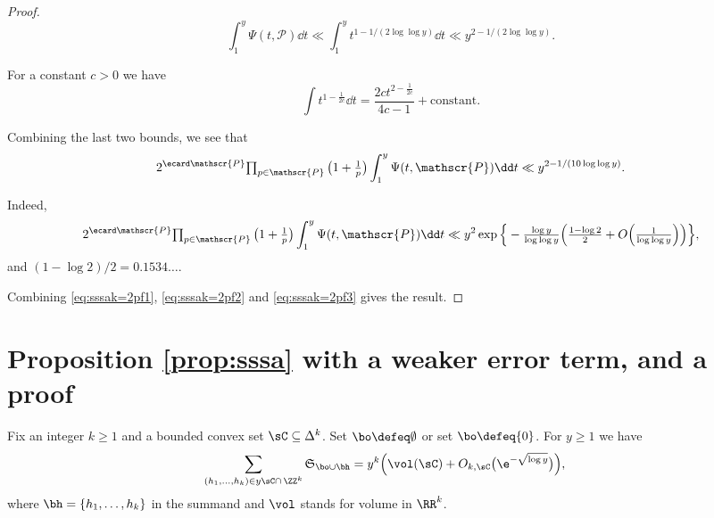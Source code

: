 \documentclass[12pt, reqno, twoside, letterpaper]{amsart}
\begin{document}
\begin{jetsam}
\begin{proof}
\[
 \int_{1}^y \Psi(t,\mathscr{P}) \dd t
  \ll
   \int_1^{y} t^{1 - 1/(2\log\log y)} \dd t
    \ll
     y^{2 - 1/(2\log\log y)}.
\]
%
\begin{nixnix}
For a constant $c > 0$ we have
\[
 \int t^{1 - \frac{1}{2c}} \dd t
  =
   \frac{2ct^{2 - \frac{1}{2c}}}{4c - 1} + \text{constant}.
\]
\end{nixnix}
%
Combining the last two bounds, we see that  
\begin{equation}
 \label{eq:sssak=2pf3}
 2^{\ecard \mathscr{P}}
    {\textstyle \prod_{p \in \mathscr{P}}  \big(1 + \frac{1}{p}\big) }
      \int_1^y \Psi(t,\mathscr{P}) \dd t
       \ll
        y^{2 - 1/(10\log\log y)}.
\end{equation}
%
\begin{nixnix}
Indeed, 
\[
 2^{\ecard \mathscr{P}}
    {\textstyle \prod_{p \in \mathscr{P}}  \big(1 + \frac{1}{p}\big) }
     \int_1^y \Psi(t,\mathscr{P}) \dd t
  \ll
   y^2
   \textstyle 
    \exp\Big\{-\frac{\log y}{\log\log y}\Big(\frac{1 - \log 2}{2} + O\Big(\frac{1}{\log\log y}\Big)\Big)\Big\},
\]
and $(1 - \log 2)/2 = 0.1534\ldots$.
\end{nixnix}

Combining \eqref{eq:sssak=2pf1}, \eqref{eq:sssak=2pf2} and 
\eqref{eq:sssak=2pf3} gives the result.
\end{proof}


\section{Proposition \ref{prop:sssa} with a weaker error term, and a proof}
 \label{Jsec:keyprop}

\begin{proposition}
 \label{Jprop:sssa}
%
Fix an integer $k \ge 1$ and a bounded convex set 
$\sC \subseteq \Delta^k$.
%
Set $\bo \defeq \emptyset$ or set $\bo \defeq \{0\}$.
%
For $y \ge 1$ we have 
\begin{align}
 \label{Jeq:sssa}
  \sum_{(h_1,\ldots,h_k) \in y\sC \cap \, \ZZ^k} 
   \mathfrak{S}_{\bo \cup \bh} 
   & =
    y^k \Big( \vol(\sC) + O_{k,\sC}\big(\e^{-\sqrt{\log y}}\big)\Big), 
\end{align}
where $\bh = \{h_1,\ldots,h_k\}$ in the summand and $\vol$ stands 
for volume in $\RR^k$.
\end{proposition}


\end{jetsam}
\end{document}
